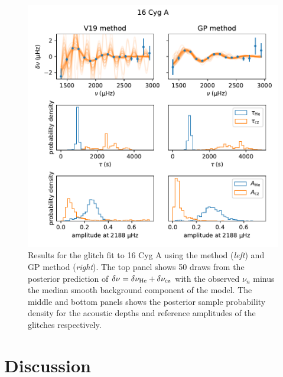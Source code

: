 \begin{figure}[!tb]
    \centering
    \includegraphics{figures/glitch-16cyga.pdf}
    \caption[Results for the glitch fit to 16 Cyg A using the V19 method and GP method.]{Results for the glitch fit to 16 Cyg A using the  method (\emph{left}) and GP method (\emph{right}). The top panel shows 50 draws from the posterior prediction of \(\delta\nu = \delta\nu_{{\mathrm{He}}} + \delta\nu_{{\mathrm{cz}}}\) with the observed \(\nu_n\) minus the median smooth background component of the model. The middle and bottom panels shows the posterior sample probability density for the acoustic depths and reference amplitudes of the glitches respectively.}
    \label{fig:glitch-16cyga}
\end{figure}

\section{Discussion}\label{sec:glitch-disc}



